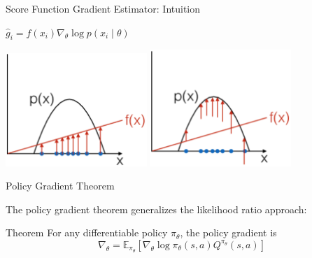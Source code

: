 \documentclass[aspectratio=169]{../latex_main/tntbeamer}  %
\begin{document}
\begin{frame}[c]{Score Function Gradient Estimator: Intuition}
	

\centering
$\hat{g}_i = f(x_i) \nabla_\theta \log p(x_i \mid \theta)$
\bigskip

\includegraphics[width=0.4\textwidth]{images/scoring_function_1.png}
\pause
\includegraphics[width=0.4\textwidth]{images/scoring_function_2.png}
	
\end{frame}
\begin{frame}[c]{Policy Gradient Theorem}
	
The policy gradient theorem generalizes the likelihood ratio approach:
\begin{block}{Theorem}
For any differentiable policy $\pi_\theta$, the policy gradient is
$$\nabla_\theta= \mathbb{E}_{\pi_\theta} [\nabla_\theta \log \pi_\theta(s,a) Q^{\pi_\theta}(s,a)] $$

\end{block}
	
\end{frame}
\end{document}
